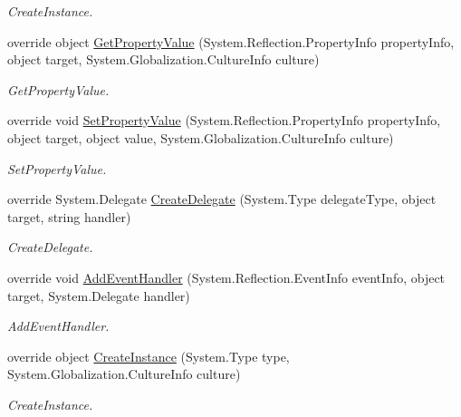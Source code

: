\begin{DoxyCompactItemize}
\begin{DoxyCompactList}\small\item\em CreateInstance. \item\end{DoxyCompactList}\item 
override object \hyperlink{class_xaml_generated_namespace_1_1_generated_internal_type_helper_afdc9fe15b56607d02082908d934480c6}{GetPropertyValue} (System.Reflection.PropertyInfo propertyInfo, object target, System.Globalization.CultureInfo culture)
\begin{DoxyCompactList}\small\item\em GetPropertyValue. \item\end{DoxyCompactList}\item 
override void \hyperlink{class_xaml_generated_namespace_1_1_generated_internal_type_helper_ade0f04c0f7b18dd5b170e071d5534d38}{SetPropertyValue} (System.Reflection.PropertyInfo propertyInfo, object target, object value, System.Globalization.CultureInfo culture)
\begin{DoxyCompactList}\small\item\em SetPropertyValue. \item\end{DoxyCompactList}\item 
override System.Delegate \hyperlink{class_xaml_generated_namespace_1_1_generated_internal_type_helper_a8ec4c37e82d9f4e867e9655f4eac3a78}{CreateDelegate} (System.Type delegateType, object target, string handler)
\begin{DoxyCompactList}\small\item\em CreateDelegate. \item\end{DoxyCompactList}\item 
override void \hyperlink{class_xaml_generated_namespace_1_1_generated_internal_type_helper_a73471f4a6d1ca4c4fceec9ad8610f0c8}{AddEventHandler} (System.Reflection.EventInfo eventInfo, object target, System.Delegate handler)
\begin{DoxyCompactList}\small\item\em AddEventHandler. \item\end{DoxyCompactList}\item 
override object \hyperlink{class_xaml_generated_namespace_1_1_generated_internal_type_helper_aefb7a98fceb9c287cef4756942f441d1}{CreateInstance} (System.Type type, System.Globalization.CultureInfo culture)
\begin{DoxyCompactList}\small\item\em CreateInstance. \item\end{DoxyCompactList}\item 

\end{DoxyCompactItemize}
